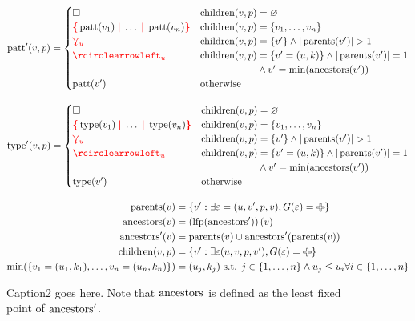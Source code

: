\begin{figure}
  \begin{align*}
    \patt'(v,p) = \begin{cases}
      \hole & \children(v,p) = \varnothing \\
      \conflictHole{\patt(v_1),\ldots,\patt(v_n)} & \children(v,p) = \{v_1, \ldots, v_n\} \\
      \multiVertex{u} & \children(v,p) = \{v'\} \land |\parents(v')| > 1 \\
      \cycleVertex{u} & \children(v,p) = \{v'=(u,k)\} \land |\parents(v')| = 1 \\
          & \phantom{\children(v,p)} \land v' = \min(\ancestors(v')) \\
      \patt(v') & \text{otherwise} \\
    \end{cases}
  \end{align*}

  \begin{align*}
    \type'(v,p) = \begin{cases}
      \hole & \children(v,p) = \varnothing \\
      \conflictHole{\type(v_1),\ldots,\type(v_n)} & \children(v,p) = \{v_1, \ldots, v_n\} \\
      \multiVertex{u} & \children(v,p) = \{v'\} \land |\parents(v')| > 1 \\
      \cycleVertex{u} & \children(v,p) = \{v'=(u,k)\} \land |\parents(v')| = 1 \\
          & \phantom{\children(v,p)} \land v' = \min(\ancestors(v')) \\
      \type(v') & \text{otherwise} \\
    \end{cases}
  \end{align*}

  \begin{align*}
    \parents(v) &= \{v' : \exists \e = (u, v', p, v), G(\e) = \Plus\} \\
    \ancestors(v) &= \left( \lfp(\ancestors') \right)(v) \\
    \ancestors'(v) &= \parents(v) \cup \ancestors'(\parents(v)) \\
    \children(v, p) &= \{v' : \exists \e (u, v, p, v'), G(\e) = \Plus\} \\
    \min(\{v_1 = (u_1, k_1), \ldots, v_n = (u_n, k_n)\}) &= (u_j, k_j) \text{ s.t. } j \in \{1, \ldots, n\} \land u_j \le u_i \forall i \in \{1, \ldots, n\}
      \end{align*}
  \caption{Caption2 goes here. Note that $\operatorname{\text{ancestors}}$ is defined as the least fixed point of $\operatorname{\text{ancestors}}'$.}
  \label{fig:Decomposition expr}
\end{figure}

